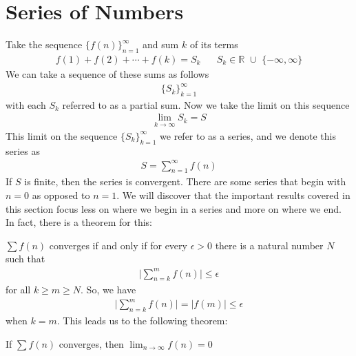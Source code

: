 \section{Series of Numbers}

\begin{definition}
Take the sequence $\{f(n)\}_{n=1}^{\infty}$ and sum $k$ of its terms
\begin{align*}
    f(1) + f(2) + \cdots + f(k) = S_{k} \hspace{20pt} S_{k} \in \mathbb{R} \hspace{4pt} \cup \hspace{4pt} \{-\infty, \infty\}
\end{align*}
We can take a sequence of these sums as follows
\begin{align*}
    \{S_{k}\}_{k=1}^{\infty}
\end{align*}
with each $S_{k}$ referred to as a partial sum. Now we take the limit on this sequence
\begin{align*}
    \lim_{k \longrightarrow \infty} S_{k} = S
\end{align*}
This limit on the sequence $\{S_{k}\}_{k=1}^{\infty}$ we refer to as a series, and we denote this series as 
\begin{align*}
    S = \sum_{n=1}^{\infty} f(n)
\end{align*}
If $S$ is finite, then the series is convergent. There are some series that begin with $n=0$ as opposed to $n=1$. We will discover that the important results covered in this section focus less on where we begin in a series and more on where we end. In fact, there is a theorem for this:
\end{definition}

\begin{theorem}
$\sum f(n)$ converges if and only if for every $\epsilon > 0$ there is a natural number $N$ such that 
\begin{align*}
    \Big\lvert \sum_{n = k}^{m} f(n) \Big\rvert \leq \epsilon
\end{align*}
for all $k \geq m \geq N$. So, we have
\begin{align*}
    \Big\lvert \sum_{n = k}^{m} f(n) \Big\rvert = \lvert f(m) \rvert \leq \epsilon
\end{align*}
when $k = m$. This leads us to the following theorem:
\end{theorem}

\begin{theorem}
If $\sum f(n)$ converges, then $\lim_{n \longrightarrow \infty} f(n) = 0$
\end{theorem}

